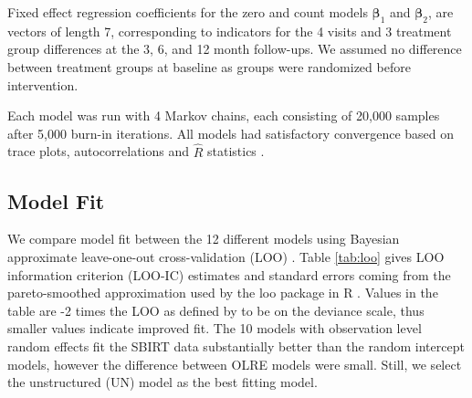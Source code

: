 \documentclass[12pt]{article}
\let\proglang=\textsf \let\code=\texttt
\begin{document}
Fixed effect regression coefficients for the zero and count models $\bm{\beta}_{1}$ and $\bm{\beta}_{2}$, are vectors of length 7, corresponding to indicators for the 4 visits and 3 treatment group differences at the 3, 6, and 12 month follow-ups. We assumed no difference between treatment groups at baseline as groups were randomized before intervention.

Each model was run with 4 Markov chains, each consisting of 20,000 samples after 5,000 burn-in iterations. All models had satisfactory convergence based on trace plots, autocorrelations and $\hat{R}$ statistics \cite{gelman1992inference}.

\subsection{Model Fit}
We compare model fit between the 12 different models using Bayesian approximate leave-one-out cross-validation (LOO) \citep{vehtari2017practical}. Table \ref{tab:loo} gives LOO information criterion (LOO-IC) estimates and standard errors coming from the pareto-smoothed approximation used by the \proglang{loo} package in R \citep{loopackage}. Values in the table are -2 times the LOO as defined by \cite{vehtari2017practical} to be on the deviance scale, thus smaller values indicate improved fit. The 10 models with observation level random effects fit the SBIRT data substantially better than the random intercept models, however the difference between OLRE models were small. Still, we select the unstructured (UN) model as the best fitting model. 
\end{document}
